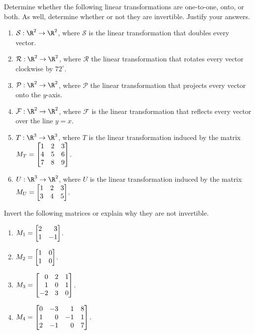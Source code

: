 \begin{exercises}
	\begin{problist}
		\prob Determine whether the following linear transformations are
		one-to-one, onto, or both. As well, determine whether or not they are
		invertible. Justify your answers.
		\begin{enumerate}
			\item $\mathcal S:\R^{2}\to\R^{2}$, where $\mathcal S$
				is the linear transformation that doubles every
				vector.

			\item $\mathcal R:\R^{2}\to\R^{2}$, where $\mathcal R$
				the linear transformation that rotates every
				vector clockwise by $72^{\circ}$.

			\item $\mathcal P:\R^{2}\to\R^{2}$, where $\mathcal P$
				the linear transformation that projects every
				vector onto the $y$-axis.

			\item $\mathcal F:\R^{2}\to\R^{2}$, where $\mathcal F$
				is the linear transformation that reflects every
				vector over the line $y=x$.

			\item $T:\R^{3}\to\R^{3}$, where $T$ is the linear
				transformation induced by the matrix
				$M_{T} = \mat{1&2&3\\4&5&6\\7&8&9}$.

			\item $U:\R^{3}\to\R^{2}$, where $U$ is the linear
				transformation induced by the matrix
				$M_{U} = \mat{1&2&3\\3&4&5}$.
		\end{enumerate}

		\prob Invert the following matrices or explain why they are not invertible.
		\begin{enumerate}
			\item $M_{1} = \mat{2&3\\1&-1}$.

			\item $M_{2} = \mat{1&0\\1&0}$.

			\item $M_{3} = \mat{0&2&1\\1&0&1\\-2&3&0}$.

			\item $M_{4} = \mat{0&-3&1&8\\1&0&-1&1\\2&-1&0&7}$.


\end{enumerate}
\end{problist}
\end{exercises}
